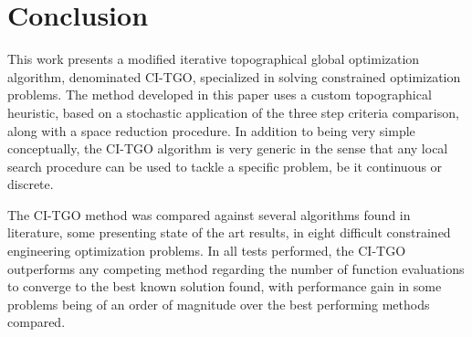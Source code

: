 \section{Conclusion} \label{sec:Conclusion}

This work presents a modified iterative topographical global optimization algorithm, denominated CI-TGO, specialized in solving constrained optimization problems. The method developed in this paper uses a custom topographical heuristic, based on a stochastic application of the three step criteria comparison, along with a space reduction procedure. In addition to being very simple conceptually, the CI-TGO algorithm is very generic in the sense that any local search procedure can be used to tackle a specific problem, be it continuous or discrete.

The CI-TGO method was compared against several algorithms found in literature, some presenting state of the art results, in eight difficult constrained engineering optimization problems. In all tests performed, the CI-TGO outperforms any competing method regarding the number of function evaluations to converge to the best known solution found, with performance gain in some problems being of an order of magnitude over the best performing methods compared.
